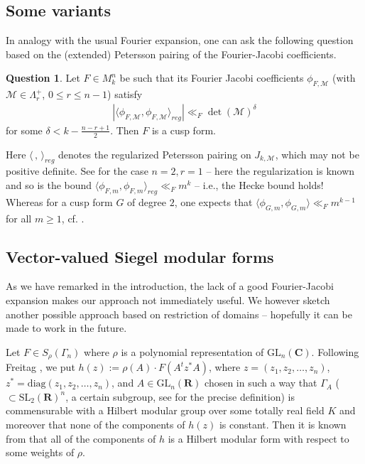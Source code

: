 \documentclass[12pt]{amsart}
\numberwithin{equation}{section}
\theoremstyle{plain}
\theoremstyle{definition}
\newtheorem{qs}[thm]{Question}
\newcommand{\mf}{\mathbf}
\newcommand{\mc}{\mathcal}
\newcommand{\mrm}{\mathrm}
\newcommand{\GL}{\mrm{GL}}
\newcommand{\sltwor}{\mrm{SL}_2(\mf R)}
\newcommand{\glnc}{\mrm{GL}_n(\mf C)}
\newcommand{\lan}{\langle }
\newcommand{\ran}{\rangle}
\begin{document}
\subsection{Some variants}\label{ext-fj}
In analogy with the usual Fourier expansion, one can ask the following question based on the (extended) Petersson pairing of the Fourier-Jacobi coefficients.

\begin{qs} \label{ext-fj-qs}
    Let $F \in M^n_k$ be such that its Fourier Jacobi coefficients $\phi_{F, \mc M}$ (with $\mc M \in \Lambda_r^+$, $0 \le r \le n-1$) satisfy
    \begin{align}
        |\lan \phi_{F, \mc M},\phi_{F, \mc M} \ran_{reg}| \ll_F \det(\mc M)^{\delta} 
    \end{align}
    for some $\delta<k-\frac{n-r+1}{2}$. Then $F$ is a cusp form.
\end{qs}
Here $\lan \, , \, \ran_{reg}$ denotes the regularized Petersson pairing on $J_{k, \mc M}$, which may not be positive definite. See \cite{bo-das5} for the case $n=2,r=1$ -- here the regularization is known and so is the bound $\displaystyle \lan \phi_{F, m },\phi_{F, m} \ran_{reg} \ll_F m^{k}$ -- i.e., the Hecke bound holds! Whereas for a cusp form $G$ of degree $2$, one expects that $\displaystyle \lan \phi_{G,m},\phi_{G,m} \ran \ll_F m^{k-1}$ for all $m \ge 1$, cf. \cite{ko-fj}.

\subsection{Vector-valued Siegel modular forms} \label{vvsmf}
As we have remarked in the introduction, the lack of a good Fourier-Jacobi expansion makes our approach not immediately useful. We however sketch another possible approach based on restriction of domains -- hopefully it can be made to work in the future.

Let $F \in S_\rho(\Gamma_n)$ where $\rho$ is a polynomial representation of $\glnc$. Following Freitag \cite{freitag1}, we put
$h(z):= \rho(A) \cdot F(A^t z^* A)$, where $z=(z_1,z_2,\ldots,z_n)$, $z^*= \mrm{diag}(z_1,z_2,\ldots,z_n)$, and $A \in \GL_{n}(\mf R)$ chosen in such a way that $\Gamma_A$ ($\subset \sltwor^n$, a certain subgroup, see \cite{freitag1} for the precise definition) is commensurable with a Hilbert modular group over some totally real field $K$ and moreover that none of the components of $h(z)$ is constant. Then it is known from \cite{freitag1} that all of the components of $h$ is a Hilbert modular form with respect to some weights of $\rho$.
\end{document}
